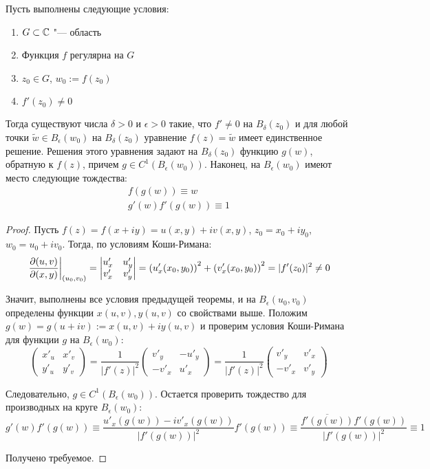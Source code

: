 \begin{theorem}
	Пусть выполнены следующие условия:
	\begin{enumerate}
		\item $G \subset \mathbb{C}$ "--- область
		\item Функция $f$ регулярна на $G$
		\item $z_0 \in G$, $w_0 := f(z_0)$
		\item $f'(z_0) \ne 0$
	\end{enumerate}

	Тогда существуют числа $\delta > 0$ и $\epsilon > 0$ такие, что $f' \ne 0$ на $B_\delta(z_0)$ и для любой точки $\widetilde w \in B_\epsilon(w_0)$ на $B_\delta(z_0)$ уравнение $f(z) = \widetilde w$ имеет единственное решение. Решения этого уравнения задают на $B_\delta(z_0)$ функцию $g(w)$, обратную к $f(z)$, причем $g \in C^1(B_\epsilon(w_0))$. Наконец, на $B_\epsilon(w_0)$ имеют место следующие тождества:
	\vspace{-6pt}
	\begin{gather*}
		f(g(w)) \equiv w \\ g'(w)f'(g(w)) \equiv 1
	\end{gather*}
\end{theorem}

\begin{proof}
	Пусть $f(z) = f(x + iy) = u(x, y) + iv(x, y)$, $z_0 = x_0 + iy_0$, $w_0 = u_0 + iv_0$. Тогда, по условиям Коши-Римана:
	\[\left.\frac{\partial (u, v)}{\partial (x, y)}\right|_{(u_0, v_0)} = \begin{vmatrix}
		u'_x & u'_y \\ v'_x & v'_y
	\end{vmatrix} = \left(u'_x(x_0, y_0)\right)^2 + \left(v'_x(x_0, y_0)\right)^2 = |f'(z_0)|^2 \ne 0\]

	Значит, выполнены все условия предыдущей теоремы, и на $B_\epsilon(u_0, v_0)$ определены функции $x(u, v), y(u, v)$ со свойствами выше. Положим $g(w) = g(u + iv) := x(u, v) + iy(u, v)$ и проверим условия Коши-Римана для функции $g$ на $B_\epsilon(w_0)$:
	\[\begin{pmatrix}
		x'_u & x'_v \\
		y'_u & y'_v
	\end{pmatrix}
	=
	\frac1{|f'(z)|^2}\begin{pmatrix}
		v'_y & -u'_y \\
		-v'_x & u'_x
	\end{pmatrix} = \frac1{|f'(z)|^2}\begin{pmatrix}
	v'_y & v'_x \\
	-v'_x & v'_y
	\end{pmatrix}\]
	
	Следовательно, $g \in C^1(B_\epsilon(w_0))$. Остается проверить тождество для производных на круге $B_\epsilon(w_0)$:
	\vspace*{-6pt}
	\[g'(w)f'(g(w)) \equiv \frac{u'_x(g(w)) - iv'_x(g(w))}{|f'(g(w))|^2}f'(g(w)) \equiv \frac{\overline{f'(g(w))}f'(g(w))}{|f'(g(w))|^2} \equiv 1\]
	
	Получено требуемое.
\end{proof}


